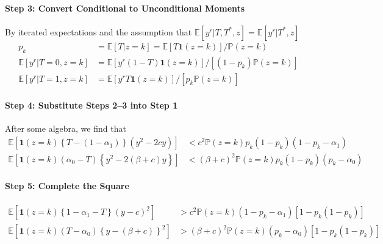 \documentclass[12pt]{article}
\begin{document}
\paragraph{Step 3: Convert Conditional to Unconditional Moments}
By iterated expectations and the assumption that $\mathbb{E}\left[ y^r|T,T^*,z \right]= \mathbb{E}\left[ y^r|T^*,z \right]$
\begin{align*}
  p_k &= \mathbb{E}[T|z=k] = \mathbb{E}\left[ T \mathbf{1}(z=k) \right]/\mathbb{P}(z=k)\\
  \mathbb{E}\left[ y^r |T=0, z=k\right] &= \mathbb{E}\left[ y^r(1 - T) \mathbf{1}(z=k) \right]/\left[ (1 - p_k) \mathbb{P}(z=k)\right]\\
  \mathbb{E}\left[ y^r |T=1, z=k\right] &= \mathbb{E}\left[ y^r T \mathbf{1}(z=k) \right]/\left[p_k \mathbb{P}(z=k)\right]
\end{align*}

\paragraph{Step 4: Substitute Steps 2--3 into Step 1}
After some algebra, we find that
\begin{align*}
  \mathbb{E}\left[ \mathbf{1}(z=k)\left\{ T - (1 - \alpha_1) \right\}\left(y^2 - 2cy \right) \right] &< c^2 \mathbb{P}(z=k)p_k(1 - p_k)(1 - p_k - \alpha_1)\\
  \mathbb{E}\left[ \mathbf{1}(z=k)(\alpha_0 - T)\left\{ y^2 - 2(\beta + c)y \right\} \right] &< (\beta + c)^2 \mathbb{P}(z=k) p_k(1 - p_k)(p_k - \alpha_0)
\end{align*}

\paragraph{Step 5: Complete the Square}
\begin{align*}
  \mathbb{E}\left[ \mathbf{1}(z=k)\left\{ 1 - \alpha_1 - T \right\}\left(y - c\right)^2 \right] &> c^2 \mathbb{P}(z=k)(1 - p_k - \alpha_1)\left[ 1 - p_k(1 - p_k) \right]\\
  \mathbb{E}\left[ \mathbf{1}(z=k)(T - \alpha_0)\left\{ y - (\beta + c) \right\}^2 \right] &> (\beta + c)^2 \mathbb{P}(z=k) (p_k - \alpha_0)\left[ 1 - p_k(1 - p_k) \right]
\end{align*}

\end{document}
